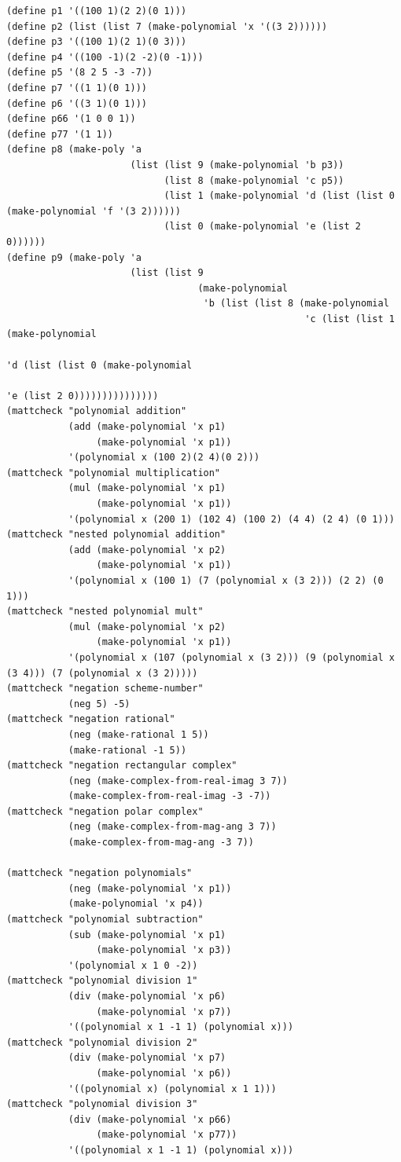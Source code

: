 \documentclass[final,fleqn,titlepage,twoside]{article}
\begin{document}
\begin{verbatim}
(define p1 '((100 1)(2 2)(0 1)))
(define p2 (list (list 7 (make-polynomial 'x '((3 2))))))
(define p3 '((100 1)(2 1)(0 3)))
(define p4 '((100 -1)(2 -2)(0 -1)))
(define p5 '(8 2 5 -3 -7))
(define p7 '((1 1)(0 1)))
(define p6 '((3 1)(0 1)))
(define p66 '(1 0 0 1))
(define p77 '(1 1))
(define p8 (make-poly 'a
                      (list (list 9 (make-polynomial 'b p3))
                            (list 8 (make-polynomial 'c p5))
                            (list 1 (make-polynomial 'd (list (list 0 (make-polynomial 'f '(3 2))))))
                            (list 0 (make-polynomial 'e (list 2 0))))))
(define p9 (make-poly 'a
                      (list (list 9
                                  (make-polynomial
                                   'b (list (list 8 (make-polynomial
                                                     'c (list (list 1 (make-polynomial
                                                                       'd (list (list 0 (make-polynomial
                                                                                         'e (list 2 0)))))))))))))))
(mattcheck "polynomial addition"
           (add (make-polynomial 'x p1)
                (make-polynomial 'x p1))
           '(polynomial x (100 2)(2 4)(0 2)))
(mattcheck "polynomial multiplication"
           (mul (make-polynomial 'x p1)
                (make-polynomial 'x p1))
           '(polynomial x (200 1) (102 4) (100 2) (4 4) (2 4) (0 1)))
(mattcheck "nested polynomial addition"
           (add (make-polynomial 'x p2)
                (make-polynomial 'x p1))
           '(polynomial x (100 1) (7 (polynomial x (3 2))) (2 2) (0 1)))
(mattcheck "nested polynomial mult"
           (mul (make-polynomial 'x p2)
                (make-polynomial 'x p1))
           '(polynomial x (107 (polynomial x (3 2))) (9 (polynomial x (3 4))) (7 (polynomial x (3 2)))))
(mattcheck "negation scheme-number"
           (neg 5) -5)
(mattcheck "negation rational"
           (neg (make-rational 1 5))
           (make-rational -1 5))
(mattcheck "negation rectangular complex"
           (neg (make-complex-from-real-imag 3 7))
           (make-complex-from-real-imag -3 -7))
(mattcheck "negation polar complex"
           (neg (make-complex-from-mag-ang 3 7))
           (make-complex-from-mag-ang -3 7))

(mattcheck "negation polynomials"
           (neg (make-polynomial 'x p1))
           (make-polynomial 'x p4))
(mattcheck "polynomial subtraction"
           (sub (make-polynomial 'x p1)
                (make-polynomial 'x p3))
           '(polynomial x 1 0 -2))
(mattcheck "polynomial division 1"
           (div (make-polynomial 'x p6)
                (make-polynomial 'x p7))
           '((polynomial x 1 -1 1) (polynomial x)))
(mattcheck "polynomial division 2"
           (div (make-polynomial 'x p7)
                (make-polynomial 'x p6))
           '((polynomial x) (polynomial x 1 1)))
(mattcheck "polynomial division 3"
           (div (make-polynomial 'x p66)
                (make-polynomial 'x p77))
           '((polynomial x 1 -1 1) (polynomial x)))


\end{verbatim}
\end{document}
